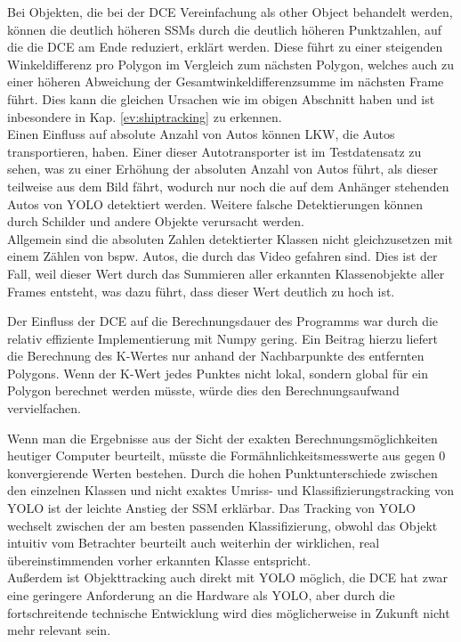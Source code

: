 {{	Bei Objekten, die bei der DCE Vereinfachung als \glqq other Object\grqq{} behandelt werden, können die deutlich höheren SSMs durch die deutlich höheren Punktzahlen, auf die die DCE am Ende reduziert, erklärt werden. Diese führt zu einer steigenden Winkeldifferenz pro Polygon im Vergleich zum nächsten Polygon, welches auch zu einer höheren Abweichung der Gesamtwinkeldifferenzsumme im nächsten Frame führt. Dies kann die gleichen Ursachen wie im obigen Abschnitt haben und ist inbesondere in Kap. \ref{ev:shiptracking} zu erkennen. \\

	Einen Einfluss auf absolute Anzahl von Autos können LKW, die Autos transportieren, haben. Einer dieser Autotransporter ist im Testdatensatz zu sehen, was zu einer Erhöhung der absoluten Anzahl von Autos führt, als dieser teilweise aus dem Bild fährt, wodurch nur noch die auf dem Anhänger stehenden Autos von YOLO detektiert werden. Weitere falsche Detektierungen können durch Schilder und andere Objekte verursacht werden. \\
	Allgemein sind die absoluten Zahlen detektierter Klassen nicht gleichzusetzen mit einem Zählen von bspw. Autos, die durch das Video gefahren sind. Dies ist der Fall, weil dieser Wert durch das Summieren aller erkannten Klassenobjekte aller Frames entsteht, was dazu führt, dass dieser Wert deutlich zu hoch ist.

	Der Einfluss der DCE auf die Berechnungsdauer des Programms war durch die relativ effiziente Implementierung mit Numpy gering. Ein Beitrag hierzu liefert die Berechnung des K-Wertes nur anhand der Nachbarpunkte des entfernten Polygons. Wenn der K-Wert jedes Punktes nicht lokal, sondern global für ein Polygon berechnet werden müsste, würde dies den Berechnungsaufwand vervielfachen.

	Wenn man die Ergebnisse aus der Sicht der exakten Berechnungsmöglichkeiten heutiger Computer beurteilt, müsste die Formähnlichkeitsmesswerte aus gegen 0 konvergierende Werten bestehen. Durch die hohen Punktunterschiede zwischen den einzelnen Klassen und nicht exaktes Umriss- und Klassifizierungstracking von YOLO ist der leichte Anstieg der SSM erklärbar. Das Tracking von YOLO wechselt zwischen der am besten passenden Klassifizierung, obwohl das Objekt intuitiv vom Betrachter beurteilt auch weiterhin der wirklichen, real übereinstimmenden vorher erkannten Klasse entspricht. \\
	Außerdem ist Objekttracking auch direkt mit YOLO möglich, die DCE hat zwar eine geringere Anforderung an die Hardware als YOLO, aber durch die fortschreitende technische Entwicklung wird dies möglicherweise in Zukunft nicht mehr relevant sein. \\

}}

